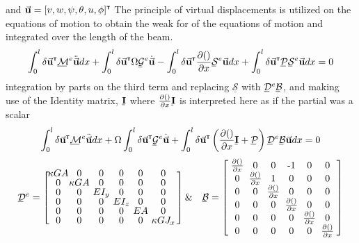 and $ \vec{\mathbf{u}}=[v,w,\psi,\theta,u,\phi]^{\textbf{{\tiny \textsf{T}}}} $ The principle of virtual displacements is utilized on the equations of motion to obtain the weak for of the equations of motion and integrated over the length of the beam.
\begin{equation}\label{eq:BeamDiffEquationVirtualStart}
\int_0^l \delta\vec{\mathbf{u}}^\T\bunderline{\mathcal{M}}^e\ddot{\vec{\mathbf{u}}}dx+\int_0^l \delta\vec{\mathbf{u}}^\T\Omega\bunderline{\mathcal{G}}^e\dot{\vec{\mathbf{u}}}-\int_0^l\delta\vec{\mathbf{u}}^\T\frac{\partial ()}{\partial x}\bunderline{\mathcal{S}}^e\vec{\mathbf{u}}dx+\int_0^l\delta\vec{\mathbf{u}}^\T\bunderline{\mathcal{P}}\bunderline{\mathcal{S}}^e\vec{\mathbf{u}}dx=0
\end{equation}
integration by parts on the third term and replacing $ \underline{\mathcal{S}} $ with $ \bunderline{\mathcal{D}}^e\bunderline{\mathcal{B}} $, and making use of the Identity matrix, $ \bunderline[2]{\mathbf{I}} $ where $ \frac{\partial()}{\partial x}\bunderline{\mathbf{I}} $ is interpreted here as if the partial was a scalar
\begin{equation}\label{key}
\int_0^l \delta\vec{\mathbf{u}}^\T\bunderline{\mathcal{M}}^e\ddot{\vec{\mathbf{u}}}dx+\Omega\int_0^l \delta\vec{\mathbf{u}}^\T\bunderline{\mathcal{G}}^e\dot{\vec{\mathbf{u}}}+\int_0^l\delta\vec{\mathbf{u}}^\T\left(\frac{\partial ()}{\partial x}\bunderline[2]{\mathbf{I}}+\bunderline{\mathcal{P}}\right)\bunderline{\mathcal{D}}^e\bunderline{\mathcal{B}}\vec{\mathbf{u}}dx=0
\end{equation}
\begin{equation}\label{key}
\def\cs{1.5em}
\bunderline{\mathcal{D}}^e=\left[\def\arraystretch{.8}\arraycolsep=1.8pt\begin{array}{cccccc}
\makebox[\cs]{$\kappa GA$}&\makebox[\cs]{0}&\makebox[\cs]{0}&\makebox[\cs]{0}&\makebox[\cs]{0}&\makebox[\cs]{0}\\
0&\kappa GA&0&0&0&0\\
0&0&EI_y&0&0&0\\
0&0&0&EI_z&0&0\\
0&0&0&0&EA&0\\
0&0&0&0&0&\kappa GJ_x
\end{array}\right] \&\quad \bunderline{\mathcal{B}}=\left[\def\arraystretch{.8}\arraycolsep=1.8pt\begin{array}{cccccc}
\makebox[\cs]{$\frac{\partial ()}{\partial x}$}&\makebox[\cs]{0}&\makebox[\cs]{0}&\makebox[\cs]{-1}&\makebox[\cs]{0}&\makebox[\cs]{0}\\
0&\frac{\partial ()}{\partial x}&1&0&0&0\\
0&0&\frac{\partial ()}{\partial x}&0&0&0\\
0&0&0&\frac{\partial ()}{\partial x}&0&0\\
0&0&0&0&\frac{\partial ()}{\partial x}&0\\
0&0&0&0&0&\frac{\partial ()}{\partial x}
\end{array}\right]
\end{equation}
